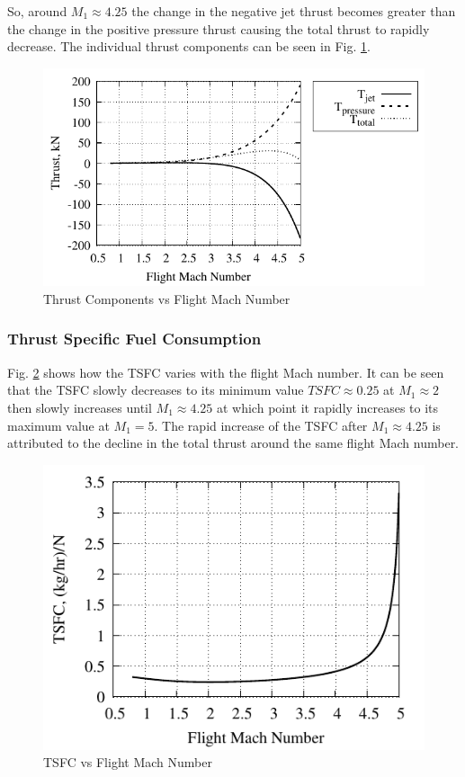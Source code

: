 \documentclass[conf]{new-aiaa} %
\begin{document}
So, around $M_1\approx4.25$ the change in the negative jet thrust becomes greater than the change in the positive pressure thrust causing the total thrust to rapidly decrease. The individual thrust components can be seen in Fig. \ref{fig:partcallthrust}.

\begin{figure}[H] %
    \centering
    \includegraphics[]{media/performance_parameter_files/part_c_all_thrust.pdf}
    \caption{\label{fig:partcallthrust}Thrust Components vs Flight Mach Number}
\end{figure}

\subsubsection{Thrust Specific Fuel Consumption}
Fig. \ref{fig:partctsfc} shows how the TSFC varies with the flight Mach number. It can be seen that the TSFC slowly decreases to its minimum value $TSFC\approx0.25$ at $M_1\approx2$ then slowly increases until $M_1\approx4.25$ at which point it rapidly increases to its maximum value at $M_1=5$. The rapid increase of the TSFC after $M_1\approx4.25$ is attributed to the decline in the total thrust around the same flight Mach number.

\begin{figure}[H] %
    \centering
    \includegraphics[]{media/performance_parameter_files/part_c_TSFC.pdf}
    \caption{\label{fig:partctsfc}TSFC vs Flight Mach Number}
\end{figure}
\end{document}
